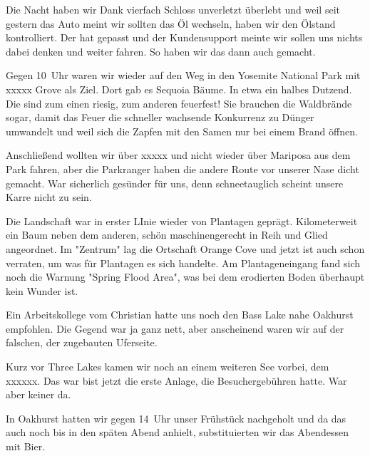 Die Nacht haben wir Dank vierfach Schloss unverletzt überlebt und weil seit gestern das Auto meint wir sollten das Öl wechseln, haben wir den Ölstand kontrolliert.
Der hat gepasst und der Kundensupport meinte wir sollen uns nichts dabei denken und weiter fahren.
So haben wir das dann auch gemacht.

Gegen 10~Uhr waren wir wieder auf den Weg in den Yosemite National Park mit xxxxx Grove als Ziel.
Dort gab es Sequoia Bäume.
In etwa ein halbes Dutzend.
Die sind zum einen riesig, zum anderen feuerfest!
Sie brauchen die Waldbrände sogar, damit das Feuer die schneller wachsende Konkurrenz zu Dünger umwandelt und weil sich die Zapfen mit den Samen nur bei einem Brand öffnen.

Anschließend wollten wir über xxxxx und nicht wieder über Mariposa aus dem Park fahren, aber die Parkranger haben die andere Route vor unserer Nase dicht gemacht.
War sicherlich gesünder für uns, denn schneetauglich scheint unsere Karre nicht zu sein.

Die Landschaft war in erster LInie wieder von Plantagen geprägt.
Kilometerweit ein Baum neben dem anderen, schön maschinengerecht in Reih und Glied angeordnet.
Im "Zentrum" lag die Ortschaft Orange Cove und jetzt ist auch schon verraten, um was für Plantagen es sich handelte.
Am Plantageneingang fand sich noch die Warnung "Spring Flood Area", was bei dem erodierten Boden überhaupt kein Wunder ist.

Ein Arbeitskollege vom Christian hatte uns noch den Bass Lake nahe Oakhurst empfohlen.
Die Gegend war ja ganz nett, aber anscheinend waren wir auf der falschen, der zugebauten Uferseite.

Kurz vor Three Lakes kamen wir noch an einem weiteren See vorbei, dem xxxxxx.
Das war bist jetzt die erste Anlage, die Besuchergebühren hatte.
War aber keiner da.

In Oakhurst hatten wir gegen 14~Uhr unser Frühstück nachgeholt und da das auch noch bis in den späten Abend anhielt, substituierten wir das Abendessen mit Bier.
